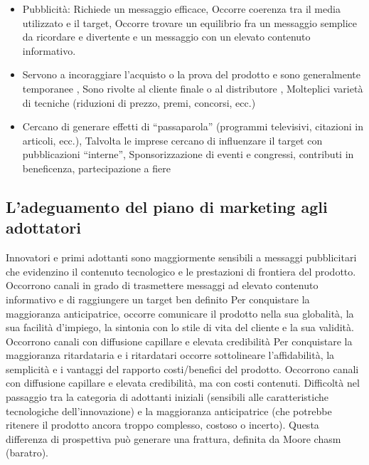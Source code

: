 \documentclass{article}
\begin{document}
\begin{itemize}
	\item Pubblicità: Richiede un messaggio efficace,
	Occorre coerenza tra il media utilizzato e il
	target, 
	Occorre trovare un equilibrio fra un
	messaggio semplice da ricordare e
	divertente e un messaggio con un elevato
	contenuto informativo.
	\item Servono a incoraggiare l’acquisto o la prova
	del prodotto e sono generalmente
	temporanee , Sono rivolte al cliente finale o al distributore ,
	Molteplici varietà di tecniche (riduzioni di
	prezzo, premi, concorsi, ecc.)
	\item Cercano di generare effetti di “passaparola”
	(programmi televisivi, citazioni in articoli, ecc.),
	Talvolta le imprese cercano di influenzare il
	target con pubblicazioni “interne”,
	Sponsorizzazione di eventi e congressi,
	contributi in beneficenza, partecipazione a fiere
\end{itemize}

\subsection{L'adeguamento del piano di marketing agli adottatori}
Innovatori e primi adottanti sono maggiormente sensibili a messaggi pubblicitari
che evidenzino il contenuto tecnologico e le prestazioni di frontiera del prodotto.
Occorrono canali in grado di trasmettere messaggi ad elevato contenuto
informativo e di raggiungere un target ben definito
Per conquistare la maggioranza anticipatrice, occorre comunicare il prodotto nella
sua globalità, la sua facilità d’impiego, la sintonia con lo stile di vita del cliente e la
sua validità.
Occorrono canali con diffusione capillare e elevata credibilità
Per conquistare la maggioranza ritardataria e i ritardatari occorre sottolineare
l’affidabilità, la semplicità e i vantaggi del rapporto costi/benefici del prodotto.
Occorrono canali con diffusione capillare e elevata credibilità, ma con costi
contenuti.
Difficoltà nel passaggio tra la categoria di adottanti iniziali (sensibili alle
caratteristiche tecnologiche dell’innovazione) e la maggioranza
anticipatrice (che potrebbe ritenere il prodotto ancora troppo
complesso, costoso o incerto).
Questa differenza di prospettiva può generare una frattura, definita da
Moore chasm (baratro).
\end{document}
